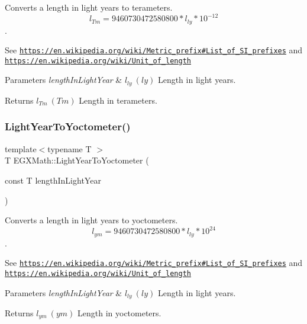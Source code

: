 Converts a length in light years to terameters. \[ l_{Tm}=9460730472580800 * l_{ly} * 10^{-12} \]. 

See \href{https://en.wikipedia.org/wiki/Metric_prefix#List_of_SI_prefixes}{\tt https\+://en.\+wikipedia.\+org/wiki/\+Metric\+\_\+prefix\#\+List\+\_\+of\+\_\+\+S\+I\+\_\+prefixes} and \href{https://en.wikipedia.org/wiki/Unit_of_length}{\tt https\+://en.\+wikipedia.\+org/wiki/\+Unit\+\_\+of\+\_\+length} 
\begin{DoxyParams}{Parameters}
{\em length\+In\+Light\+Year} & $ l_{ly}\ (ly)$ Length in light years. \\
\hline
\end{DoxyParams}
\begin{DoxyReturn}{Returns}
$ l_{Tm}\ (Tm)$ Length in terameters. 
\end{DoxyReturn}
\mbox{\label{group___e_g_x_math-_conversions-_length_conversions-_astronomical-_light_year-_s_i_ga2e306829867215c96b04e558db7d15b9}} 
\subsubsection{\texorpdfstring{Light\+Year\+To\+Yoctometer()}{LightYearToYoctometer()}}
{\footnotesize\ttfamily template$<$typename T $>$ \\
T E\+G\+X\+Math\+::\+Light\+Year\+To\+Yoctometer (\begin{DoxyParamCaption}\item[{const T}]{length\+In\+Light\+Year }\end{DoxyParamCaption})}



Converts a length in light years to yoctometers. \[ l_{ym}=9460730472580800 * l_{ly} * 10^{24} \]. 

See \href{https://en.wikipedia.org/wiki/Metric_prefix#List_of_SI_prefixes}{\tt https\+://en.\+wikipedia.\+org/wiki/\+Metric\+\_\+prefix\#\+List\+\_\+of\+\_\+\+S\+I\+\_\+prefixes} and \href{https://en.wikipedia.org/wiki/Unit_of_length}{\tt https\+://en.\+wikipedia.\+org/wiki/\+Unit\+\_\+of\+\_\+length} 
\begin{DoxyParams}{Parameters}
{\em length\+In\+Light\+Year} & $ l_{ly}\ (ly)$ Length in light years. \\
\hline
\end{DoxyParams}
\begin{DoxyReturn}{Returns}
$ l_{ym}\ (ym)$ Length in yoctometers. 
\end{DoxyReturn}
\mbox{\label{group___e_g_x_math-_conversions-_length_conversions-_astronomical-_light_year-_s_i_ga2b65212eca253e0742a29d3d5f4d7a27}} 
